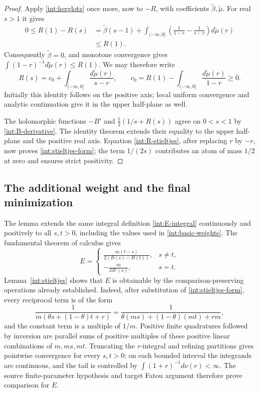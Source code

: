 \documentclass[11pt]{article}
\theoremstyle{remark}\newtheorem{remark}[theorem]{Remark}
\begin{document}
\begin{proof}
Apply \eqref{int:herglotz} once more, now to $-R$, with coefficients
$\widetilde\beta,\widetilde\mu$.  For real $s>1$ it gives
\begin{align*}
 0\le R(1)-R(s)
 &=\widetilde\beta(s-1)
   +\int_{(-\infty,0]}
      \left(\frac1{1-r}-\frac1{s-r}\right)d\widetilde\mu(r)\\
 &\le R(1).
\end{align*}
Consequently $\widetilde\beta=0$, and monotone convergence gives
$\int(1-r)^{-1}d\widetilde\mu(r)\le R(1)$.  We may therefore write
\begin{equation}\label{int:R-stieltjes}
 R(s)=c_0+\int_{(-\infty,0]}\frac{d\widetilde\mu(r)}{s-r},
 \qquad
 c_0=R(1)-\int_{(-\infty,0]}\frac{d\widetilde\mu(r)}{1-r}\ge0.
\end{equation}
Initially this identity follows on the positive axis; local uniform
convergence and analytic continuation give it in the upper half-plane
as well.

The holomorphic functions $-B'$ and $\tfrac12(1/s+R(s))$ agree on
$0<s<1$ by \eqref{int:B-derivative}. The identity theorem extends their
equality to the upper half-plane and the positive real axis. Equation
\eqref{int:R-stieltjes}, after replacing $r$ by $-r$, now proves
\eqref{int:stieltjes-form}; the term $1/(2s)$ contributes an atom
of mass $1/2$ at zero and ensures strict positivity.
\end{proof}

\subsection{The additional weight and the final minimization}

The lemma extends the same integral definition \eqref{int:E-integral}
continuously and positively to all $s,t>0$, including the values used in
\eqref{int:basic-weights}. The fundamental theorem of calculus gives
\begin{equation}\label{int:E}
 E=
 \begin{cases}
 \displaystyle\frac{m(t-s)}{2(B(s)-B(t))},&s\ne t,\\[6pt]
 \displaystyle-\frac{m}{2B'(s)},&s=t.
\end{cases}
\end{equation}
Lemma~\ref{int:stieltjes} shows that $E$ is obtainable by the
comparison-preserving operations already established.  Indeed, after
substitution of \eqref{int:stieltjes-form}, every reciprocal term is
of the form
\[
 \frac1{m(\theta s+(1-\theta)t+r)}
 =\frac1{\theta(ms)+(1-\theta)(mt)+rm},
\]
and the constant term is a multiple of $1/m$.
Positive finite quadratures followed by inversion are parallel sums
of positive multiples of these positive linear combinations of
$m,ms,mt$.  Truncating the $r$-integral and refining partitions gives
pointwise convergence for every $s,t>0$: on each bounded interval the
integrands are continuous, and the tail is controlled by
$\int(1+r)^{-1}d\nu(r)<\infty$.
The source finite-parameter hypothesis and target Fatou argument
therefore prove comparison for $E$.
\end{document}
